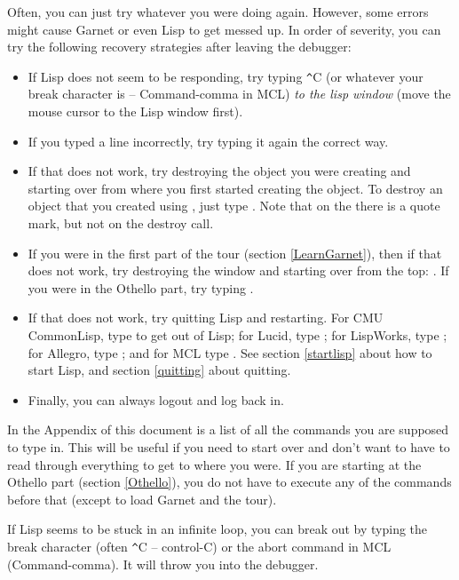 Often, you can just try whatever you were doing again.  However, some
errors might cause Garnet or even Lisp to get messed up.  In order of
severity, you can try the following recovery strategies after leaving
the debugger:
\begin{itemize}
\item If Lisp does not seem to be responding, try typing {\texttt \^}C (or whatever your
break character is -- Command-comma in MCL) {\it to the lisp window}
(move the mouse cursor to the Lisp window first).

\item If you typed a line incorrectly, try typing it again the correct way.

\item If that does not work, try destroying the object you were creating and
starting over from where you first started creating the object.  To destroy
an object that you created using , just type
.  Note that on the  there
is a quote mark, but not on the destroy call.

\item If you were in the first part of the tour (section \ref{LearnGarnet}), then
if that does not work, try destroying the window and starting over from the
top: .  If you were in the Othello part, try typing
.

\item If that does not work, try quitting Lisp and restarting.  For CMU
CommonLisp, type  to get out of Lisp; for Lucid, type
; for LispWorks, type ;  for Allegro,
type ; and for MCL type .  See section
\ref{startlisp} about how to start Lisp, and section \ref{quitting}
about quitting.

\item Finally, you can always logout and log back in.
\end{itemize}

In the Appendix
of this document is a list of all the commands you are supposed
to type in.  This will be useful if you need to start over and don't want
to have to read through everything to get to where you were.  If you
are starting at the Othello part (section \ref{Othello}), you do not have
to execute any of the commands before that (except to load Garnet and the
tour).

If Lisp seems to be stuck in an infinite loop, you can break out by typing
the break character (often {\texttt \^}C -- control-C) or the abort command in
MCL (Command-comma).  It will throw you into the debugger.

